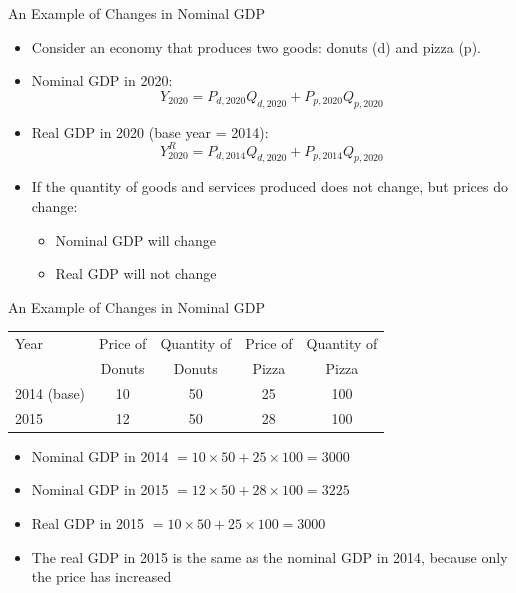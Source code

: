 \documentclass[aspectratio=1610]{beamer}
\begin{document}
\begin{frame}[wide]{An Example of Changes in Nominal GDP}
	\begin{itemize}
		\item Consider an economy that produces two goods: donuts (d) and pizza (p).
		\item Nominal GDP in 2020:
		\[Y_{2020} = P_{d,2020} Q_{d,2020} + P_{p,2020} Q_{p,2020}\]
		\item Real GDP in 2020 (base year = 2014):
		\[Y^R_{2020} = P_{d,2014} Q_{d,2020} + P_{p,2014} Q_{p,2020}\]
		\item If the quantity of goods and services produced does not change, but prices do change:
		\begin{itemize}
			\item Nominal GDP will change
			\item Real GDP will not change
		\end{itemize}
	\end{itemize}
\end{frame}

\begin{frame}[wide]{An Example of Changes in Nominal GDP}
	\begin{table}[htbp]
		\centering
		\begin{tabular}{lcccc}
			Year  & Price of  & Quantity of  & Price of  & Quantity of  \\
			& Donuts &  Donuts &  Pizza & Pizza \\
			\midrule
			2014 (base) & 10    & 50    & 25    & 100 \\
			2015  & 12    & 50    & 28    & 100 \\
			\bottomrule
		\end{tabular}%
	\end{table}%
	\begin{itemize}
		\item Nominal GDP in 2014 $= 10\times 50 + 25 \times 100 = 3000$
		\item Nominal GDP in 2015 $= 12 \times 50 + 28 \times 100 = 3225$
		\item Real GDP in 2015 $= 10 \times 50 + 25 \times 100 = 3000$
		\item The real GDP in 2015 is the same as the nominal GDP in 2014, because only the price has increased
	\end{itemize}
\end{frame}
\end{document}
